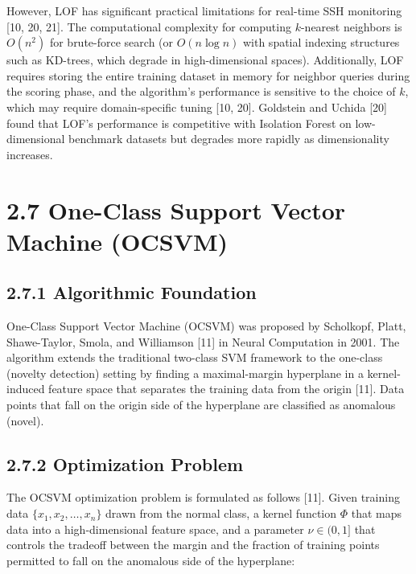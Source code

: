 \documentclass[
  a4paper]{report}
\begin{document}
However, LOF has significant practical limitations for real-time SSH
monitoring {[}10, 20, 21{]}. The computational complexity for computing
\(k\)-nearest neighbors is \(O(n^2)\) for brute-force search (or
\(O(n \log n)\) with spatial indexing structures such as KD-trees, which
degrade in high-dimensional spaces). Additionally, LOF requires storing
the entire training dataset in memory for neighbor queries during the
scoring phase, and the algorithm's performance is sensitive to the
choice of \(k\), which may require domain-specific tuning {[}10, 20{]}.
Goldstein and Uchida {[}20{]} found that LOF's performance is
competitive with Isolation Forest on low-dimensional benchmark datasets
but degrades more rapidly as dimensionality increases.

\section{2.7 One-Class Support Vector Machine
(OCSVM)}\label{one-class-support-vector-machine-ocsvm}

\subsection{2.7.1 Algorithmic
Foundation}\label{algorithmic-foundation-2}

One-Class Support Vector Machine (OCSVM) was proposed by Scholkopf,
Platt, Shawe-Taylor, Smola, and Williamson {[}11{]} in Neural
Computation in 2001. The algorithm extends the traditional two-class SVM
framework to the one-class (novelty detection) setting by finding a
maximal-margin hyperplane in a kernel-induced feature space that
separates the training data from the origin {[}11{]}. Data points that
fall on the origin side of the hyperplane are classified as anomalous
(novel).

\subsection{2.7.2 Optimization Problem}\label{optimization-problem}

The OCSVM optimization problem is formulated as follows {[}11{]}. Given
training data \(\{x_1, x_2, \ldots, x_n\}\) drawn from the normal class,
a kernel function \(\Phi\) that maps data into a high-dimensional
feature space, and a parameter \(\nu \in (0, 1]\) that controls the
tradeoff between the margin and the fraction of training points
permitted to fall on the anomalous side of the hyperplane:
\end{document}
